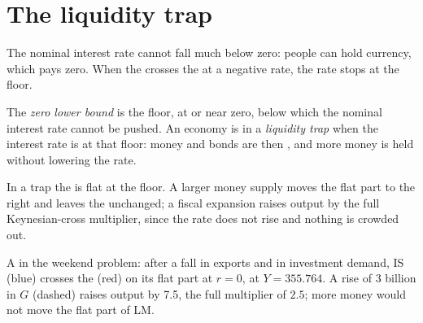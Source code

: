 \section{The liquidity trap}\label{sec:b1:is-lm:trap}

The nominal interest rate cannot fall much below zero: people can hold
currency, which pays zero. When the  crosses the  at a
negative rate, the rate stops at the floor.

\begin{definition}\label{def:b1:is-lm:liquidity-trap}
The \emph{zero lower bound} is the floor, at or near zero, below which the
nominal interest rate cannot be pushed. An economy is in a \emph{liquidity
trap} when the interest rate is at that floor: money and bonds are then
, and more money is held without lowering the rate.
\end{definition}

In a trap the  is flat at the floor. A larger money supply moves
the flat part to the right and leaves the  unchanged; a fiscal
expansion raises output by the full Keynesian-cross multiplier, since the
rate does not rise and nothing is crowded out.

\begin{omfigure}

{\small A  in the weekend problem: after a fall in exports and
in investment demand, IS (blue) crosses the  (red) on its flat part
at $r = 0$, at $Y = 355.764$. A rise of 3 billion in $G$ (dashed) raises output by
7.5, the full multiplier of $2.5$; more money would not move the flat part
of LM.}
\end{omfigure}

